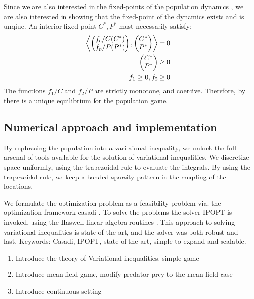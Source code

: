 Since we are also interested in the fixed-points of the population dynamics , we are also interested in showing that the fixed-point of the dynamics exists and is unqiue.
 An interior fixed-point $C^*, P^*$ must necessarily satisfy:
\begin{align}
  \left \langle \begin{pmatrix} f_c/C(C^*) \\ f_p/P(P^*)\end{pmatrix},\begin{pmatrix} C^* \\ P^* \end{pmatrix} \right \rangle = 0 \\
  \begin{pmatrix} C^* \\ P^* \end{pmatrix} \geq 0 \\
  f_1 \geq 0, f_2 \geq 0
\end{align}
The functions $f_1/C$ and $f_2/P$ are strictly monotone, and coercive. Therefore, by  there is a unique equilibrium for the population game. 
\subsection*{Numerical approach and implementation}
By rephrasing the population into a varitaional inequality, we unlock the full arsenal of tools available for the solution of variational inequalities. We discretize space uniformly, using the trapezoidal rule to evaluate the integrals. By using the trapezoidal rule, we keep a banded sparsity pattern in the coupling of the locations.

We formulate the optimization problem as a feasibility problem via. the optimization framework casadi \citep{}. To solve the problems the solver IPOPT \citep{} is invoked, using the Haswell linear algebra routines \citep{}. This approach to solving variational inequalities is state-of-the-art, and the solver was both robust and fast.
Keywords: Casadi, IPOPT, state-of-the-art, simple to expand and scalable.

\begin{enumerate}
  \item
    Introduce the theory of Variational inequalities, simple game
  \item
    Introduce mean field game, modify predator-prey to the mean field case
  \item
    Introduce continuous setting
\end{enumerate}
